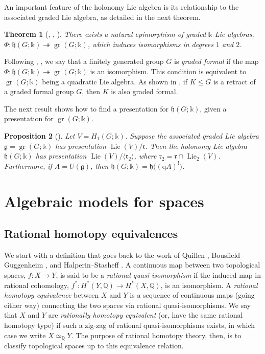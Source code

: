 \documentclass{article}
\numberwithin{equation}{section}
\newtheorem{theorem}{Theorem}[section]
\newtheorem{proposition}[theorem]{Proposition}
\theoremstyle{definition}
\newcommand{\Q}{\mathbb{Q}}
\renewcommand{\k}{\mathbb{k}}
\newcommand{\g}{{\mathfrak{g}}}
\newcommand{\h}{{\mathfrak{h}}}
\newcommand{\fr}{\mathfrak{r}}
\DeclareMathOperator{\gr}{gr}
\DeclareMathOperator{\Lie}{Lie}
\newcommand{\surj}{\twoheadrightarrow}
\newcommand{\qA}{\mathrm{q}A}
\begin{document}
An important feature of the holonomy Lie algebra
is its relationship to the associated graded Lie algebra, 
as detailed in the next theorem. 

\begin{theorem}[\cite{MP}, \cite{PS-imrn04}, \cite{SW-jpaa}]
 \label{thm:holoepi}
There exists a natural epimorphism of graded $\k$-Lie algebras, 
$\Phi\colon \h(G; {\k}) \surj \gr(G;\k)$, 
which induces isomorphisms in degrees $1$ and $2$.  
\end{theorem}

Following \cite{SW-jpaa}, \cite{SW-forum}, we say that a finitely generated 
group $G$ is {\em graded formal}\/ if the map 
$\Phi \colon \h(G;\k) \surj \gr(G; \k)$ is an isomorphism. 
This condition is equivalent to $\gr(G; \k)$ being a quadratic Lie algebra. 
As shown in \cite{SW-forum}, if $K\le G$ is a retract 
of a graded formal group $G$, then $K$ is also graded formal. 

The next result shows how to find a presentation for $\h(G;\k)$, 
given a presentation for $\gr(G;\k)$.
 
\begin{proposition}[\cite{SW-forum}]
 \label{prop:closure}
Let $V=H_1(G;\k)$. 
Suppose the associated graded Lie algebra $\g=\gr(G;\k)$ 
has presentation $\Lie(V)/\fr$. 
Then the holonomy Lie algebra $\h(G;\k)$ has presentation 
$\Lie(V)/\langle \fr_2\rangle $, where $\fr_2=\fr\cap \Lie_2(V)$.  
Furthermore, if $A=U(\g)$, then $\h(G;\k)=\h\big((\qA)^{!}\big)$. 
\end{proposition}

\section{Algebraic models for spaces}
\label{sect:algmod}

\subsection{Rational homotopy equivalences}
\label{subsec:rht}
We start with a definition that goes back to the work of Quillen \cite{Qu69}, 
Bousfield--Guggen\-heim \cite{BG76}, and Halperin--Stasheff \cite{HS79}. 
A continuous map between two topological spaces, $f\colon X\to Y$,  
is said to be a {\em rational quasi-isomorphism}\/ if the induced map 
in rational cohomology, $f^*\colon H^{*}(Y,\Q)\to H^{*}(X,\Q)$, 
is an isomorphism.  A {\em rational homotopy equivalence}\/ 
between $X$ and $Y$ is a sequence of continuous maps 
(going either way) connecting the two spaces via rational 
quasi-isomorphisms.  We say that $X$ and $Y$ are {\em 
rationally homotopy equivalent}\/ (or, have the same rational 
homotopy type) if such a zig-zag of rational quasi-isomorphisms 
exists, in which case we write $X\simeq_{\Q} Y$.  The purpose 
of rational homotopy theory, then, is to classify topological spaces 
up to this equivalence relation. 
\end{document}
